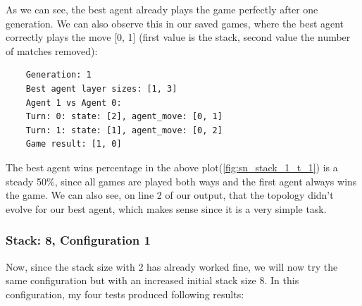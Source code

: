 \documentclass[11pt]{report}
\begin{document}
\begin{enumerate}
\begin{center}
    \end{center}

    As we can see, the best agent already plays the game perfectly after one generation.
    We can also observe this in our saved games, where the best agent correctly plays the move [0, 1] (first value is the stack, second value the number of matches removed):
    \begin{verbatim}
    Generation: 1
    Best agent layer sizes: [1, 3]
    Agent 1 vs Agent 0:
    Turn: 0: state: [2], agent_move: [0, 1]
    Turn: 1: state: [1], agent_move: [0, 2]
    Game result: [1, 0]
    \end{verbatim}
    The best agent wins percentage in the above plot(\ref{fig:sn_stack_1_t_1}) is a steady 50\%, since all games are played both ways and the first agent always wins the game.
    We can also see, on line 2 of our output, that the topology didn't evolve for our best agent, which makes sense since it is a very simple task.
            \subsubsection{Stack: 8, Configuration 1}
    Now, since the stack size with 2 has already worked fine, we will now try the same configuration but with an increased initial stack size 8.
    In this configuration, my four tests produced following results:
    \\
\begin{figure}[htbp!]


\end{figure}
\end{enumerate}
\end{document}
